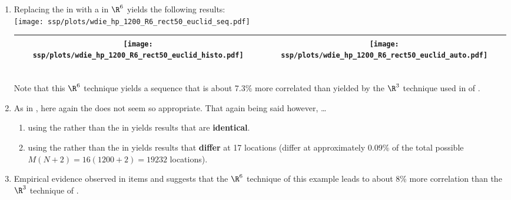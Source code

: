 \begin{example}
\begin{enumerate}
  \item \label{item:wdie_hp_R6_rect50_euclid}
        Replacing the  in 
        with a  in $\R^6$ yields the following results:
        \\\texttt{[image: ssp/plots/wdie\_hp\_1200\_R6\_rect50\_euclid\_seq.pdf]}
        \\\begin{tabular}{|>{\scs}c|>{\scs}c|}
             \hline
             \texttt{[image: ssp/plots/wdie\_hp\_1200\_R6\_rect50\_euclid\_histo.pdf]}
            &\texttt{[image: ssp/plots/wdie\_hp\_1200\_R6\_rect50\_euclid\_auto.pdf]}
           \\\hline
        \end{tabular}\\
     Note that this $\R^6$ technique yields a sequence that is about 7.3\% more correlated than yielded by the $\R^3$ technique
     used in  of .

  \item As in , here again the  does not seem so appropriate.
        That again being said however, \ldots 
    \begin{enumerate}
      \item using the  rather than the  in 
             yields results that are 
            \textbf{identical}. %
      \item using the  rather than the  in 
             yields results that \textbf{differ} at 17 locations
            (differ at approximately 0.09\% of the total possible $M(N+2)=16(1200+2)=19232$ 
            locations). %
    \end{enumerate}

  \item Empirical evidence observed in items
                     and
        suggests that the $\R^6$ technique of this example leads to about 8\% more correlation 
        than the $\R^3$ technique of .

\end{enumerate}
\end{example}



